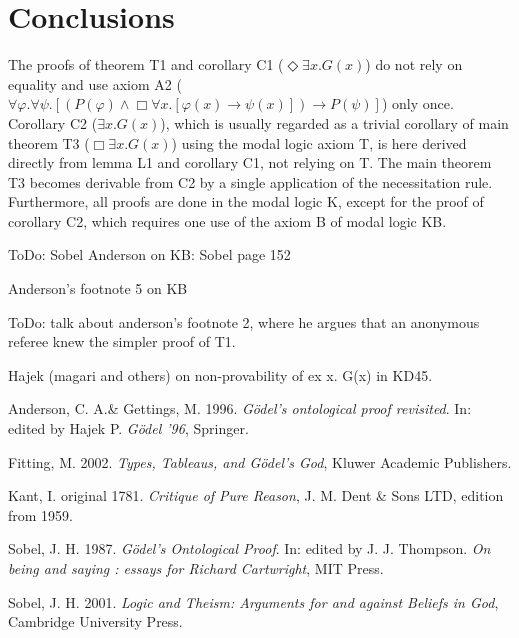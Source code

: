 \documentclass{llncs}
\newcommand{\imp}{\rightarrow}
\newcommand{\all}{\forall}
\newcommand{\ex}{\exists}
\newcommand{\nec}{\Box} %
\newcommand{\pos}{\Diamond} %
\begin{document}


\section{Conclusions}

The proofs of theorem T1 and corollary C1 ($\pos \ex x. G(x)$) do not rely on equality and use axiom A2 ($\all \varphi. \all \psi.[(P(\varphi) \wedge \nec \all x.[\varphi(x) \imp \psi(x)]) \imp P(\psi)]$) only once. 
Corollary C2 ($\ex x. G(x)$), which is usually regarded as a trivial corollary of main theorem T3 ($\nec \ex x. G(x)$) using the modal logic axiom T, is here derived directly from lemma L1 and corollary C1, not relying on T. The main theorem T3 becomes derivable from C2 by a single application of the necessitation rule. Furthermore, all proofs are done in the modal logic K, except for the proof of corollary C2, which requires one use of the axiom B of modal logic KB.

ToDo: Sobel Anderson on KB: Sobel page 152

Anderson's footnote 5 on KB

ToDo: talk about anderson's footnote 2, where he argues that an anonymous referee knew the simpler proof of T1.

Hajek (magari and others) on non-provability of ex x. G(x) in KD45.


\begin{thebibliography}{9}


Anderson, C. A.\& Gettings, M. 1996.  {\itshape G\"odel's ontological proof revisited}. In: edited by Hajek P. {\itshape G\"odel '96},  Springer. 


Fitting, M. 2002.  {\itshape Types, Tableaus, and G\"odel's God}, Kluwer Academic Publishers.  

Kant, I.  original 1781.   {\itshape Critique of Pure Reason}, J. M. Dent \& Sons LTD, edition from 1959.

Sobel, J. H. 1987. {\itshape G\"odel's Ontological Proof}. In: edited by J. J. Thompson. {\itshape On being and saying : essays for Richard Cartwright},  MIT Press. 

Sobel, J. H. 2001. {\itshape Logic and Theism: Arguments for and against Beliefs in God}, Cambridge University Press. 



\end{thebibliography}
\end{document}
